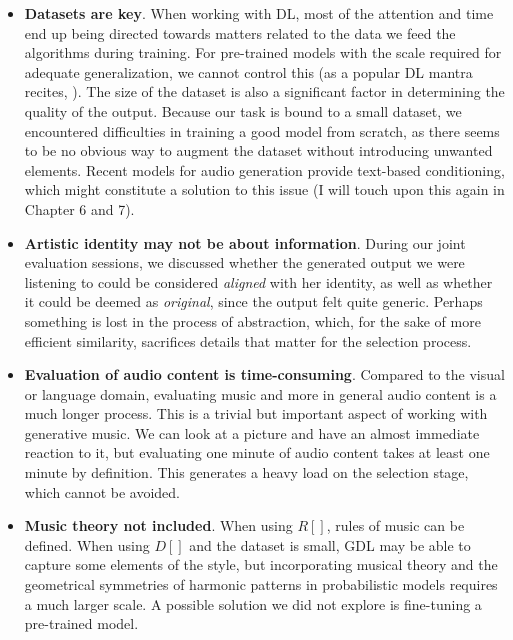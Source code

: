 \begin{itemize}

	\item \textbf{Datasets are key}. When working with DL, most of the attention and time end up being directed towards matters related to the data we feed the algorithms during training. For pre-trained models with the scale required for adequate generalization, we cannot control this (as a popular DL mantra recites, ). The size of the dataset is also a significant factor in determining the quality of the output. Because our task is bound to a small dataset, we encountered difficulties in training a good model from scratch, as there seems to be no obvious way to augment the dataset without introducing unwanted elements. Recent models for audio generation provide text-based conditioning, which might constitute a solution to this issue (I will touch upon this again in Chapter 6 and 7).
	\item \textbf{Artistic identity may not be about information}. During our joint evaluation sessions, we discussed whether the generated output we were listening to could be considered \emph{aligned} with her identity, as well as whether it could be deemed as \emph{original}, since the output felt quite generic. Perhaps something is lost in the process of abstraction, which, for the sake of more efficient similarity, sacrifices details that matter for the selection process.
	\item \textbf{Evaluation of audio content is time-consuming}. Compared to the visual or language domain, evaluating music and more in general audio content is a much longer process. This is a trivial but important aspect of working with generative music. We can look at a picture and have an almost immediate reaction to it, but evaluating one minute of audio content takes at least one minute by definition. This generates a heavy load on the selection stage, which cannot be avoided.
	\item \textbf{Music theory not included}. When using $R[]$, rules of music can be defined. When using $D[]$ and the dataset is small, GDL may be able to capture some elements of the style, but incorporating musical theory and the geometrical symmetries of harmonic patterns in probabilistic models requires a much larger scale. A possible solution we did not explore is fine-tuning a pre-trained model.
\end{itemize}

